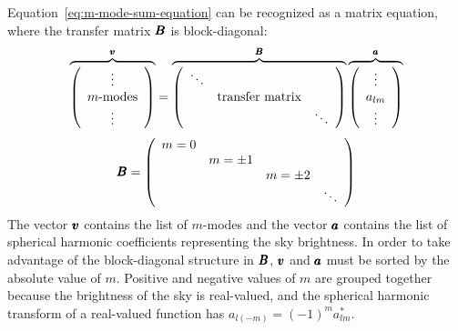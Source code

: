 \begin{bibunit}
Equation~\ref{eq:m-mode-sum-equation} can be recognized as a matrix equation, where the transfer
matrix $\pmb B$ is block-diagonal:
\begin{equation}\label{eq:m-mode-matrix-equation}
    \overbrace{\left(
        \begin{array}{c}
            \vdots \\
            m\text{-modes} \\
            \vdots \\
        \end{array}
    \right)}^{\pmb v}
    =
    \overbrace{\left(
        \begin{array}{ccc}
            \ddots & & \\
            & \text{transfer matrix} & \\
            & & \ddots \\
        \end{array}
    \right)}^{\pmb B}
    \overbrace{\left(
        \begin{array}{c}
            \vdots \\
            a_{lm} \\
            \vdots \\
        \end{array}
    \right)}^{\pmb a}
\end{equation}
\begin{equation}
    \pmb B = \left(\begin{array}{cccc}
        m = 0 &&& \\
              & m=\pm1 && \\
              && m=\pm2 & \\
              &&& \ddots \\
    \end{array}\right)
\end{equation}
The vector $\pmb v$ contains the list of $m$-modes and the vector $\pmb a$ contains the list of
spherical harmonic coefficients representing the sky brightness. In order to take advantage of the
block-diagonal structure in $\pmb B$, $\pmb v$ and $\pmb a$ must be sorted by the absolute value of $m$.
Positive and negative values of $m$ are grouped together because the brightness of the sky is
real-valued, and the spherical harmonic transform of a real-valued function has $a_{l(-m)} = (-1)^m
a_{lm}^*$.


\end{bibunit}

